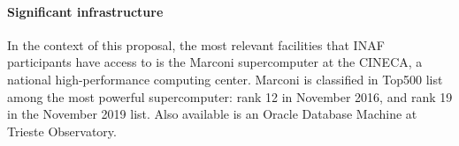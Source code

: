 \paragraph{Significant infrastructure}

In the context of this proposal, the most relevant facilities that INAF participants have access to is the Marconi supercomputer at the CINECA, a national high-performance computing center. Marconi is classified in Top500 list among the most powerful supercomputer:  rank 12 in November 2016, and rank 19 in the November 2019 list. Also available is an Oracle Database Machine at Trieste Observatory.